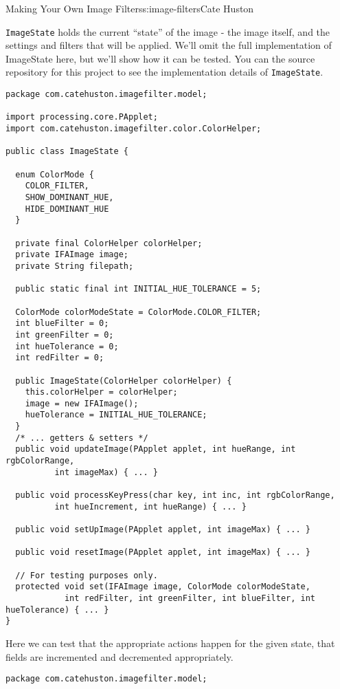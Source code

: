 \begin{aosachapter}{Making Your Own Image Filters}{s:image-filters}{Cate Huston}
\label{image-state-and-associated-tests}

\texttt{ImageState} holds the current ``state'' of the image - the image
itself, and the settings and filters that will be applied. We'll omit
the full implementation of ImageState here, but we'll show how it can be
tested. You can the source repository for this project to see the
implementation details of \texttt{ImageState}.

\begin{verbatim}
package com.catehuston.imagefilter.model;

import processing.core.PApplet;
import com.catehuston.imagefilter.color.ColorHelper;

public class ImageState {

  enum ColorMode {
    COLOR_FILTER,
    SHOW_DOMINANT_HUE,
    HIDE_DOMINANT_HUE
  }

  private final ColorHelper colorHelper;
  private IFAImage image;
  private String filepath;

  public static final int INITIAL_HUE_TOLERANCE = 5;

  ColorMode colorModeState = ColorMode.COLOR_FILTER;
  int blueFilter = 0;
  int greenFilter = 0;
  int hueTolerance = 0;
  int redFilter = 0;

  public ImageState(ColorHelper colorHelper) {
    this.colorHelper = colorHelper;
    image = new IFAImage();
    hueTolerance = INITIAL_HUE_TOLERANCE;
  }
  /* ... getters & setters */
  public void updateImage(PApplet applet, int hueRange, int rgbColorRange, 
          int imageMax) { ... }

  public void processKeyPress(char key, int inc, int rgbColorRange,
          int hueIncrement, int hueRange) { ... }

  public void setUpImage(PApplet applet, int imageMax) { ... }

  public void resetImage(PApplet applet, int imageMax) { ... }

  // For testing purposes only.
  protected void set(IFAImage image, ColorMode colorModeState,
            int redFilter, int greenFilter, int blueFilter, int hueTolerance) { ... }
}
\end{verbatim}

Here we can test that the appropriate actions happen for the given
state, that fields are incremented and decremented appropriately.

\begin{verbatim}
package com.catehuston.imagefilter.model;


\end{verbatim}
\end{aosachapter}
